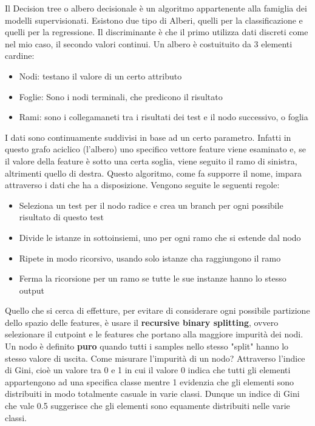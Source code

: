 Il Decision tree o albero decisionale è un algoritmo appartenente alla famiglia dei modelli supervisionati. Esistono due tipo di Alberi, quelli per la classificazione e quelli per la regressione. Il discriminante è che il primo utilizza dati discreti come nel mio caso, il secondo valori continui.
Un albero è costuituito da 3 elementi cardine:
\begin{itemize}
    \item Nodi: testano il valore di un certo attributo
    \item Foglie: Sono i nodi terminali, che predicono il risultato
    \item Rami: sono i collegamaneti tra i risultati dei test e il nodo successivo, o foglia
\end{itemize}
I dati sono continuamente suddivisi in base ad un certo parametro. Infatti in questo grafo aciclico (l'albero) uno specifico vettore feature viene esaminato e, se il valore della feature è sotto una certa soglia, viene seguito il ramo di sinistra, altrimenti quello di destra. Questo algoritmo, come fa supporre il nome, impara attraverso i dati che ha a disposizione.
\newline Vengono seguite le seguenti regole:
\begin{itemize}
    \item Seleziona un test per il nodo radice e crea un branch per ogni possibile risultato di questo test
    \item Divide le istanze in sottoinsiemi, uno per ogni ramo che si estende dal nodo
    \item Ripete in modo ricorsivo, usando solo istanze cha raggiungono il ramo
    \item Ferma la ricorsione per un ramo se tutte le sue instanze hanno lo stesso output
\end{itemize}
Quello che si cerca di effetture, per evitare di considerare ogni possibile partizione dello spazio delle features, è usare il \textbf{recursive binary splitting}, ovvero selezionare il cutpoint e le features che portano alla maggiore impurità dei nodi. Un nodo è definito \textbf{puro} quando tutti i samples nello stesso "split" hanno lo stesso valore di uscita. Come misurare l'impurità di un nodo? Attraverso l'indice di Gini, cioè un valore tra 0 e 1 in cui il valore 0 indica che tutti gli elementi appartengono ad una specifica classe mentre 1 evidenzia che gli elementi sono distribuiti in modo totalmente casuale in varie classi. Dunque un indice di Gini che vale 0.5 suggerisce che gli elementi sono equamente distribuiti nelle varie classi.
